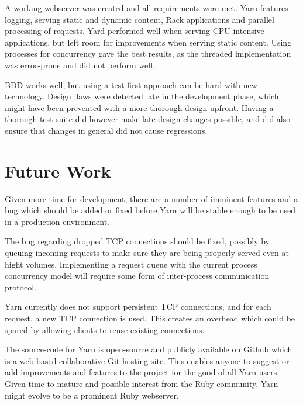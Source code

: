 A working webserver was created and all requirements were met. Yarn features
logging, serving static and dynamic content, Rack applications and parallel
processing of requests. Yard performed well when serving CPU intensive
applications, but left room for improvements when serving static content.
Using processes for concurrency gave the best results, as the threaded
implementation was error-prone and did not perform well.

BDD works well, but using a test-first approach can be hard with new
technology. Design flaws were detected late in the development phase, which
might have been prevented with a more thorough design upfront. Having a
thorough test suite did however make late design changes possible, and did
also ensure that changes in general did not cause regressions.

\section{Future Work}
Given more time for development, there are a number of imminent features and
a bug which should be added or fixed before Yarn will be stable enough to be
used in a production environment.

The bug regarding dropped TCP connections should be fixed, possibly by
queuing incoming requests to make sure they are being properly served
even at hight volumes. Implementing a request queue with the current process
concurrency model will require some form of inter-process communication
protocol.

Yarn currently does not support persistent TCP connections, and for each
request, a new TCP connection is used. This creates an overhead which could be
spared by allowing clients to reuse existing connections.

The source-code for Yarn is open-source and publicly available on Github which
is a web-based collaborative Git hosting site. This enables anyone to suggest
or add improvements and features to the project for the good of all Yarn
users. Given time to mature and possible interest from the Ruby community,
Yarn might evolve to be a prominent Ruby webserver.
